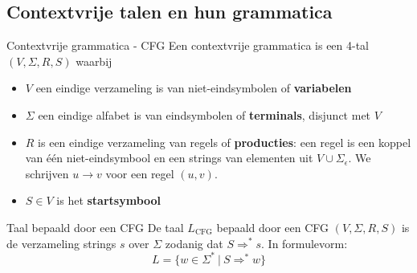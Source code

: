 

\subsection{Contextvrije talen en hun grammatica}

\vspace{0.5cm}

\begin{theo}{Contextvrije grammatica - CFG}
    Een contextvrije grammatica is een 4-tal $(V, \Sigma, R, S)$ waarbij
    \begin{itemize}
        \item $V$ een eindige verzameling is van niet-eindsymbolen of \textbf{variabelen}
        \item $\Sigma$ een eindige alfabet is van eindsymbolen of \textbf{terminals}, disjunct met $V$
        \item $R$ is een eindige verzameling van regels of \textbf{producties}: een regel is een koppel van één niet-eindsymbool en een strings van elementen uit $V \cup \Sigma_{\epsilon}$. 
              We schrijven $u \to v$ voor een regel $(u,v)$.
        \item $S \in V$ is het \textbf{startsymbool}
    \end{itemize}
    \vspace{-0.3cm}
\end{theo}

\begin{theo}{Taal bepaald door een CFG}
    De taal $L_{\text{CFG}}$ bepaald door een CFG $(V, \Sigma, R, S)$ is de verzameling strings $s$ over $\Sigma$ zodanig dat $S \Rightarrow^* s$. In formulevorm:
    \begin{equation*}
        L = \{ w \in \Sigma^* \ | \ S \Rightarrow^* w \}
    \end{equation*}
    \vspace{-0.5cm}
\end{theo}

